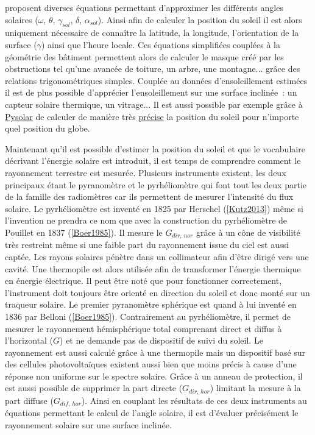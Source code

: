  proposent diverses équations permettant d’approximer
les différents angles solaires ($\omega$, $\theta$, $\gamma_{sol}$, $\delta$, $\alpha_{sol}$).
Ainsi afin de calculer la position du soleil il est alors uniquement nécessaire de connaître la latitude, la longitude,
l’orientation de la surface ($\gamma$) ainsi que l’heure locale. Ces équations simplifiées
couplées à la géométrie des bâtiment permettent alors de calculer le masque créé par les obstructions
tel qu’une avancée de toiture, un arbre, une montagne... grâce des relations trigonométriques simples.
Couplée au données d’ensoleillement estimées il est de plus possible d’apprécier l’ensoleillement
sur une surface inclinée~: un capteur solaire thermique, un vitrage...
Il est aussi possible par exemple grâce à \href{http://pysolar.org/}{Pysolar} de calculer
de manière très \href{http://docs.pysolar.org/en/latest/#validation}{précise} la
position du soleil pour n’importe quel position du globe.


Maintenant qu’il est possible d’estimer la position du soleil et que le vocabulaire
décrivant l’énergie solaire est introduit, il est temps de comprendre comment
le rayonnement terrestre est mesurée. Plusieurs instruments existent, les deux principaux
étant le pyranomètre et le pyrhéliomètre qui font tout les deux partie de la famille
des radiomètres car ils permettent de mesurer l’intensité du flux solaire.
Le pyrhéliomètre est inventé en 1825 par Herschel (\ref{Kutz2013}) même si l’invention
ne prendra ce nom que avec la construction du pyrhéliomètre de Pouillet en 1837 (\ref{Boer1985}).
Il mesure le $G_{dir,\,nor}$ grâce à un cône de visibilité très
restreint même si une faible part du rayonnement issue du ciel est aussi captée.
Les rayons solaires pénètre dans un collimateur afin d’être dirigé vers une cavité.
Une thermopile est alors utilisée afin de transformer l’énergie thermique en énergie électrique.
Il peut être noté que pour fonctionner correctement, l’instrument doit toujours être orienté
en direction du soleil et donc monté sur un traqueur solaire.
Le premier pyranomètre sphérique est quand à lui inventé en 1836 par Belloni (\ref{Boer1985}).
Contrairement au pyrhéliomètre, il permet de mesurer le rayonnement hémisphérique total
comprenant direct et diffus à l’horizontal ($G$) et ne demande pas de dispositif de
suivi du soleil. Le rayonnement est aussi calculé grâce à une thermopile mais un
dispositif basé sur des cellules photovoltaïques existent aussi bien que moins précis
à cause d’une réponse non uniforme sur le spectre solaire. Grâce à un anneau de protection,
il est aussi possible de supprimer la part directe ($G_{dir,\,hor}$) limitant la mesure
à la part diffuse ($G_{dif,\,hor}$). Ainsi en couplant les résultats de ces deux instruments
au équations permettant le calcul de l’angle solaire, il est d’évaluer précisément le
rayonnement solaire sur une surface inclinée.


